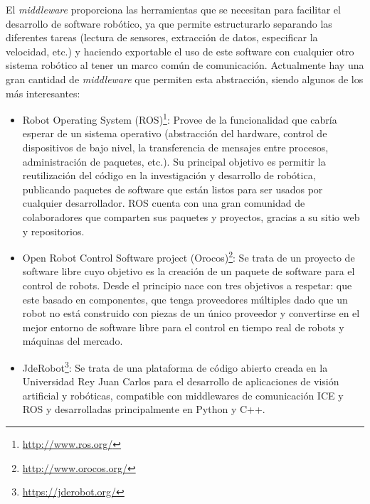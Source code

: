 El \textit{middleware} proporciona las herramientas que se necesitan para facilitar el desarrollo de software robótico, ya que permite estructurarlo separando las diferentes tareas (lectura de sensores, extracción de datos, especificar la velocidad, etc.) y haciendo exportable el uso de este software con cualquier otro sistema robótico al tener un marco común de comunicación.
Actualmente hay una gran cantidad de \textit{middleware} que permiten esta abstracción, siendo algunos de los más interesantes:
\begin{itemize}
	\item Robot Operating System (ROS)\footnote{\url{http://www.ros.org/}}: Provee de la funcionalidad que cabría esperar de un sistema operativo (abstracción del hardware, control de dispositivos de bajo nivel, la transferencia de mensajes entre procesos, administración de paquetes, etc.). Su principal objetivo es permitir la reutilización del código en la investigación y desarrollo de robótica, publicando paquetes de software que están listos para ser usados por cualquier desarrollador. ROS cuenta con una gran comunidad de colaboradores que comparten sus paquetes y proyectos, gracias a su sitio web y repositorios.
	\item Open Robot Control Software project (Orocos)\footnote{\url{http://www.orocos.org/}}: Se trata de un proyecto de software libre cuyo objetivo es la creación de un paquete de software para el control de robots. Desde el principio nace con tres objetivos a respetar: que este basado en componentes, que tenga proveedores múltiples dado que un robot no está construido con piezas de un único proveedor y convertirse en el mejor entorno de software libre para el control en tiempo real de robots y máquinas del mercado.
	\item JdeRobot\footnote{\url{https://jderobot.org/}}: Se trata de una plataforma de código abierto creada en la Universidad Rey Juan Carlos para el desarrollo de aplicaciones de visión artificial y robóticas, compatible con middlewares de comunicación ICE y ROS y desarrolladas principalmente en Python y C++. 
\end{itemize}

